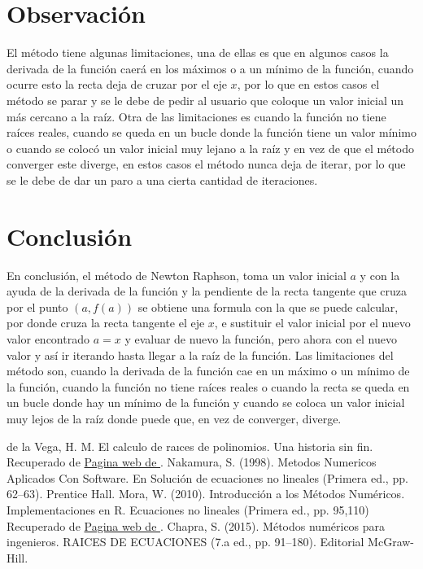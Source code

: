 \documentclass[12pt]{article}
\begin{document}
		\section*{\centering Observación}\label{sec:Observacion}
			El método tiene algunas limitaciones, una de ellas es que en algunos casos la derivada de la función 
			caerá en los máximos o a un mínimo de la función, cuando ocurre esto la recta deja de cruzar por el 
			eje $ x $, por lo que en estos casos el método se parar y se le debe de pedir al usuario que coloque 
			un valor inicial un más cercano a la raíz. Otra de las limitaciones es cuando la función no tiene raíces 
			reales, cuando se queda en un bucle donde la función tiene un valor mínimo o cuando se colocó un 
			valor inicial muy lejano a la raíz y en vez de que el método converger este diverge, en estos casos el 
			método nunca deja de iterar, por lo que se le debe de dar un paro a una cierta cantidad de iteraciones.

		\section*{\centering Conclusión}\label{sec:Conclusion}
			En conclusión, el método de Newton Raphson, toma un valor inicial $ a $ y con la ayuda de la derivada de la 
			función y la pendiente de la recta tangente que cruza por el punto $ (a,f(a)) $ 
			se obtiene una formula con la que se puede calcular, por donde cruza la recta tangente el eje $ x $, 
			e sustituir el valor inicial por el nuevo valor encontrado $ a = x $ y evaluar de nuevo la función, pero 
			ahora con el nuevo valor y así ir iterando hasta llegar a la raíz de la función. Las limitaciones del 
			método son, cuando la derivada de la función cae en un máximo o un mínimo de la función, cuando 
			la función no tiene raíces reales o cuando la recta se queda en un bucle donde hay un mínimo de la 
			función y cuando se coloca un valor inicial muy lejos de la raíz donde puede que, en vez de 
			converger, diverge.

		\centering
		\begin{thebibliography}{10}
			 de la Vega, H. M. El calculo de raıces de polinomios. Una historia sin fin. Recuperado de
							\href{http://www.matedu.cinvestav.mx/~elcalculoysuensenanza/investigacion/articulosPDF/Madrid.pdf}{Pagina web de \cite{bib:item1}}.
			 Nakamura, S. (1998). Metodos Numericos Aplicados Con Software. En Solución de ecuaciones no lineales (Primera ed., pp. 62–63). Prentice Hall.
			 Mora, W. (2010). Introducción a los Métodos Numéricos. Implementaciones en R. Ecuaciones no lineales (Primera ed., pp. 95,110) Recuperado de
							\href{https://tecdigital.tec.ac.cr/revistamatematica/Libros/WMora_MetodosNumericos/2017_Principal_MetodosNumericos-con-R.pdf}{Pagina web de \cite{bib:item3}}. 
							 Chapra, S. (2015). Métodos numéricos para ingenieros. RAICES DE ECUACIONES (7.a ed., pp. 91–180). Editorial McGraw-Hill.					
			
		\end{thebibliography}

	
\end{document}
